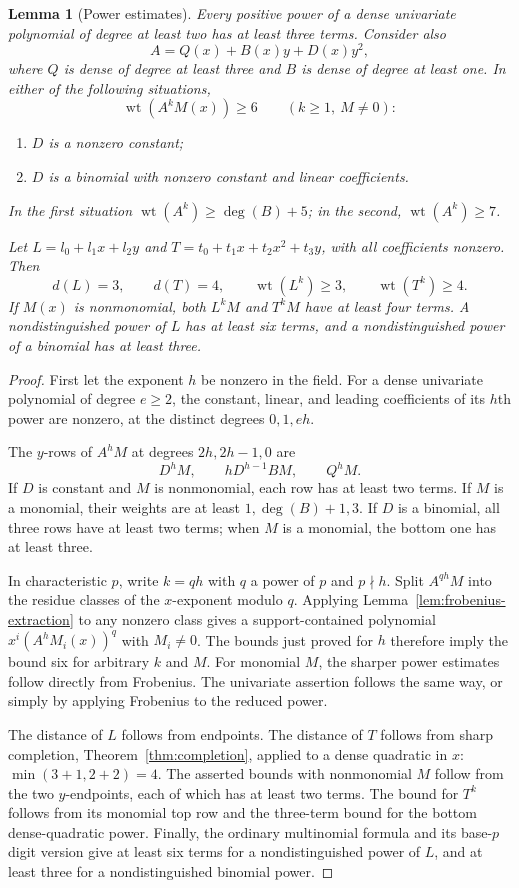 \documentclass[11pt]{article}
\DeclareMathOperator{\wt}{wt}\DeclareMathOperator{\ord}{ord}
\numberwithin{equation}{section}
\newtheorem{lemma}[theorem]{Lemma}
\theoremstyle{definition}\newtheorem{definition}[theorem]{Definition}
\theoremstyle{remark}\newtheorem{remark}[theorem]{Remark}
\begin{document}
\begin{lemma}[Power estimates]\label{lem:initial-powers}
Every positive power of a dense univariate polynomial of degree at least
two has at least three terms.  Consider also
\[
 A=Q(x)+B(x)y+D(x)y^2,
\]
where $Q$ is dense of degree at least three and $B$ is dense of degree at
least one.  In either of the following situations,
\[
 \wt(A^kM(x))\geq6\qquad(k\geq1,\ M\ne0):
\]
\begin{enumerate}
 \item $D$ is a nonzero constant;
 \item $D$ is a binomial with nonzero constant and linear coefficients.
\end{enumerate}
In the first situation $\wt(A^k)\geq\deg(B)+5$; in the second,
$\wt(A^k)\geq7$.

Let $L=l_0+l_1x+l_2y$ and
$T=t_0+t_1x+t_2x^2+t_3y$, with all coefficients nonzero.  Then
\[
 d(L)=3,\qquad d(T)=4,\qquad
 \wt(L^k)\geq3,\qquad\wt(T^k)\geq4.
\]
If $M(x)$ is nonmonomial, both $L^kM$ and $T^kM$ have at least four
terms.  A nondistinguished power of $L$ has at least six terms, and a
nondistinguished power of a binomial has at least three.
\end{lemma}
\begin{proof}
First let the exponent $h$ be nonzero in the field.  For a dense
univariate polynomial of degree $e\geq2$, the constant, linear, and
leading coefficients of its $h$th power are nonzero, at the distinct
degrees $0,1,eh$.

The $y$-rows of $A^hM$ at degrees $2h,2h-1,0$ are
\[
 D^hM,\qquad hD^{h-1}BM,\qquad Q^hM.
\]
If $D$ is constant and $M$ is nonmonomial, each row has at least two
terms.  If $M$ is a monomial, their weights are at least
$1,\deg(B)+1,3$.  If $D$ is a binomial, all three rows have at least two
terms; when $M$ is a monomial, the bottom one has at least three.

In characteristic $p$, write $k=qh$ with $q$ a power of $p$
and $p\nmid h$. Split $A^{qh}M$ into the residue classes of the
$x$-exponent modulo $q$. Applying Lemma~\ref{lem:frobenius-extraction}
to any nonzero class gives a support-contained polynomial
$x^i(A^hM_i(x))^q$ with $M_i\ne0$.
The bounds just proved for $h$ therefore imply the bound six for
arbitrary $k$ and $M$. For monomial $M$, the sharper power estimates
follow directly from Frobenius. The univariate assertion follows
the same way, or simply by applying Frobenius to the reduced power.

The distance of $L$ follows from endpoints.  The distance of $T$ follows
from sharp completion, Theorem~\ref{thm:completion}, applied to a dense
quadratic in $x$: $\min(3+1,2+2)=4$.  The asserted bounds with nonmonomial
$M$ follow from the two $y$-endpoints, each of which has at least two
terms.  The bound for $T^k$ follows from its monomial top row and the
three-term bound for the bottom dense-quadratic power.  Finally, the
ordinary multinomial formula and its base-$p$ digit version give at least
six terms for a nondistinguished power of $L$, and at least three for a
nondistinguished binomial power.
\end{proof}
\end{document}
